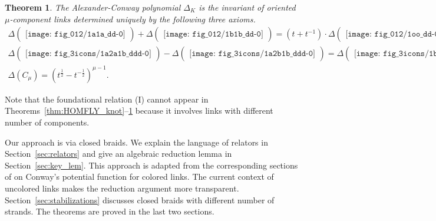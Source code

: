 \documentclass[12pt]{amsart}
\newtheorem{thm}{Theorem}[section]
\theoremstyle{definition}
\theoremstyle{remark}
\begin{document}
\begin{thm}
\label{thm:Alexander-Conway_knot}
The Alexander-Conway polynomial $\Delta_K$ is
the invariant of oriented $\mu$-component links
determined uniquely by the following three axioms.
{\allowdisplaybreaks
\begin{gather*}
\Delta
\begin{pmatrix}
\texttt{[image: fig\_012/1a1a\_dd-0]}
\end{pmatrix}
+ \Delta
\begin{pmatrix}
\texttt{[image: fig\_012/1b1b\_dd-0]}
\end{pmatrix}
=(t+t^{-1})
\cdot \Delta
\begin{pmatrix}
\texttt{[image: fig\_012/1oo\_dd-0]}
\end{pmatrix} ;
\tag*{\rm(II$_\Delta$)}
\\
\Delta
\begin{pmatrix}
\texttt{[image: fig\_3icons/1a2a1b\_ddd-0]}
\end{pmatrix}
- \Delta
\begin{pmatrix}
\texttt{[image: fig\_3icons/1a2b1b\_ddd-0]}
\end{pmatrix}
=
\Delta
\begin{pmatrix}
\texttt{[image: fig\_3icons/1b2a1a\_ddd-0]}
\end{pmatrix}
- \Delta
\begin{pmatrix}
\texttt{[image: fig\_3icons/1b2b1a\_ddd-0]}
\end{pmatrix} ;
\tag*{\rm(III$_\Delta$)}
\\
\Delta(C_\mu) = (t^{\frac12}-t^{-\frac12})^{\mu-1} .
\tag*{\rm(C$_\Delta$)}
\end{gather*}
}
\end{thm}

Note that the foundational relation (I) cannot appear in
Theorems~\ref{thm:HOMFLY_knot}--\ref{thm:Alexander-Conway_knot}
because it involves links with different number of components.

Our approach is via closed braids.
We explain the language of relators in Section~\ref{sec:relators} and
give an algebraic reduction lemma in Section~\ref{sec:key_lem}.
This approach is adapted from the corresponding sections of \cite{J1}
on Conway's potential function for colored links.
The current context of uncolored links makes the reduction argument more transparent.
Section~\ref{sec:stabilizations} discusses closed braids with different number of strands.
The theorems are proved in the last two sections.
\end{document}
